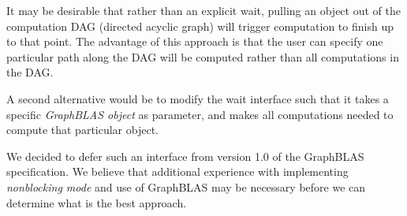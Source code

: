 It may be desirable that rather than an explicit {\sf wait}, pulling an object out of the computation DAG (directed acyclic graph) will trigger computation to finish up to that point. The advantage of this approach is that the user can specify one particular path along the DAG will be computed rather than all computations in the DAG.

A second alternative would be to modify the {\sf wait} interface such that it takes a specific \emph{GraphBLAS object} as parameter, and makes all computations needed to compute that particular object.

We decided to defer such an interface from version 1.0 of the GraphBLAS specification. We believe that additional experience with implementing \emph{nonblocking mode} and use of GraphBLAS may be necessary before we can determine what is the best approach.

